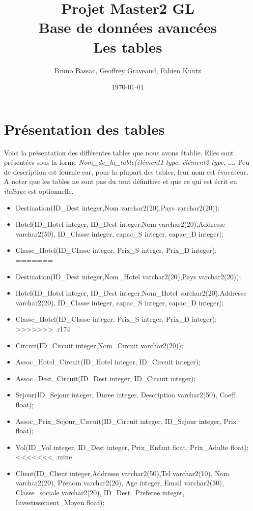 \documentclass[10pt]{article}
\author{Bruno Bassac, Geoffrey Graveaud, Fabien Kuntz}
\title{\textbf{Projet Master2 GL} \\
\textbf{Base de données avancées} \\
Les tables}
\date{\today}
\begin{document}
\maketitle

\section{Présentation des tables}
Voici la présentation des différentes tables que nous avons établie. Elles sont présentées sous la forme \textit{Nom\_de\_la\_table(élément1 type, élément2 type, $\dots$}. Peu de description est fournie car, pour la plupart des tables, leur nom est évocateur. A noter que les tables ne sont pas du tout définitive et que ce qui est écrit en \textit{italique} est optionnelle.\bigskip

\begin{itemize}
<<<<<<< .mine
\item Destination(ID\_Dest integer,Nom varchar2(20),Pays varchar2(20));\\
\item Hotel(ID\_Hotel integer, ID\_Dest integer,Nom varchar2(20),Addresse varchar2(50), ID\_Classe integer, capac\_S integer, capac\_D integer);\\
\item Classe\_Hotel(ID\_Classe integer, Prix\_S integer, Prix\_D integer);\\
=======
\item Destination(ID\_Dest integer,Nom_Hotel varchar2(20),Pays varchar2(20));\\
\item Hotel(ID\_Hotel integer, ID\_Dest integer,Nom_Hotel varchar2(20),Addresse varchar2(20), ID\_Classe integer, capac\_S integer, capac\_D integer);\\
\item Classe\_Hotel(ID\_Classe integer, Prix\_S integer, Prix\_D integer);\\
>>>>>>> .r174
\item Circuit(ID\_Circuit integer,Nom\_Circuit varchar2(20));\\
\item Assoc\_Hotel\_Circuit(ID\_Hotel integer, ID\_Circuit integer);\\
\item Assoc\_Dest\_Circuit(ID\_Dest integer, ID\_Circuit integer);\\
\item Sejour(ID\_Sejour integer, Duree integer, Description varchar2(50), Coeff float);\\
\item Assoc\_Prix\_Sejour\_Circuit(ID\_Circuit integer, ID\_Sejour integer, Prix float);\\
\item Vol(ID\_Vol integer, ID\_Dest integer, Prix\_Enfant float, Prix\_Adulte float);\\
<<<<<<< .mine
\item Client(ID\_Client integer,Addresse varchar2(50),Tel varchar2(10), Nom varchar2(20), Prenom varchar2(20), Age integer, Email varchar2(30), Classe\_sociale varchar2(20), ID\_Dest\_Preferee integer, Investissement\_Moyen float);\\


\end{itemize}
\end{document}
